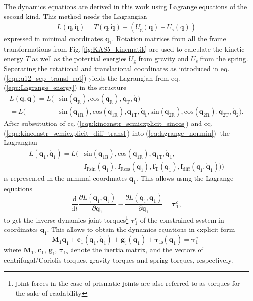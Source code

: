 \documentclass{svproc}
\newcommand{\bm}[1]{\boldsymbol{#1}}
\begin{document}
The dynamics equations are derived in this work using Lagrange equations of the second kind. This method needs the Lagrangian
%
\begin{align}
L(\bm{q},\dot{\bm{q}}) = T(\bm{q},\dot{\bm{q}})-(U_{\mathrm{g}}(\bm{q})+U_{\mathrm{s}}(\bm{q}))
\label{equ:Lagrange_energy}
\end{align}
%
expressed in minimal coordinates $\bm{q}_{1}$.
Rotation matrices from all the frame transformations from Fig.\,\ref{fig:KAS5_kinematik} are used to calculate the kinetic energy $T$ as well as the potential energies $U_{\mathrm{g}}$ from gravity and $U_{\mathrm{s}}$ from the spring.
Separating the rotational and translational coordinates as introduced in eq.\,(\ref{equ:q12_sep_transl_rot}) yields the Lagrangian from eq.\,(\ref{equ:Lagrange_energy}) in the structure
%
\begin{align}
L(\bm{q},\dot{\bm{q}}) =L( & \mathrm{sin}  (\bm{q}_{\mathrm{R}}),\mathrm{cos}(\bm{q}_{\mathrm{R}}), \bm{q}_{\mathrm{T}},\dot{\bm{q}}) \\\label{eq:lagrange_nonmin}
=L( & \mathrm{sin}  (\bm{q}_{1\mathrm{R}}),\mathrm{cos}(\bm{q}_{1\mathrm{R}}), \bm{q}_{1\mathrm{T}},\dot{\bm{q}}_{1}, \mathrm{sin}  (\bm{q}_{2\mathrm{R}}),\mathrm{cos}(\bm{q}_{2\mathrm{R}}), \bm{q}_{2\mathrm{T}},\dot{\bm{q}}_{2}). \nonumber
\end{align}
%
After substitution of eq.\,(\ref{equ:kinconstr_semiexplicit_sincos}) and eq.\,(\ref{equ:kinconstr_semiexplicit_diff_transl}) into (\ref{eq:lagrange_nonmin}), the Lagrangian
%
\begin{align}
L(\bm{q}_1,\dot{\bm{q}}_1)=L( & \mathrm{sin} (\bm{q}_{1\mathrm{R}}),\mathrm{cos}(\bm{q}_{1\mathrm{R}}), \bm{q}_{1\mathrm{T}},\dot{\bm{q}}_{1}, \\ &
\bm{f}_{\mathrm{R}\mathrm{sin}}(\bm{q}_1),
\bm{f}_{\mathrm{R}\mathrm{cos}}(\bm{q}_1),
\bm{f}_{\mathrm{T}}(\bm{q}_1),
\bm{f}_{\mathrm{diff}}(\bm{q}_1,\dot{\bm{q}}_1))) \nonumber
\end{align}
%
is represented in the minimal coordinates $\bm{q}_1$.
This allows using the Lagrange equations
%
\begin{equation}
\frac{\mathrm{d}}{{\mathrm{d}}t}\frac{\partial L(\bm{q}_1,\dot{\bm{q}}_1)}{\partial \dot{\bm{q}}_1} - \frac{\partial L(\bm{q}_1,\dot{\bm{q}}_1)}{\partial \bm{q}_1}= \bm{\tau}^c_1,
\end{equation}
%
to get the inverse dynamics joint torques\footnote{joint forces in the case of prismatic joints are also referred to as torques for the sake of readability} $\bm{\tau}^c_1$ of the constrained system in coordinates $\bm{q}_1$.
This allows to obtain the dynamics equations in explicit form
%
\begin{equation}
\bm{M}_1\ddot{\bm{q}}_1+\bm{c}_1(\bm{q}_1,\dot{\bm{q}}_1)+\bm{g}_1(\bm{q}_1) + \bm{\tau}_{1\mathrm{s}}(\bm{q}_1) = \bm{\tau}^c_1,
\label{equ:Dyn_MinKoord}
\end{equation}
%
where $\bm{M}_1$, $\bm{c}_1$, $\bm{g}_1$, $\bm{\tau}_{1\mathrm{s}}$ denote the inertia matrix, and the vectors of centrifugal/Coriolis torques, gravity torques and spring torques, respectively.
\end{document}

